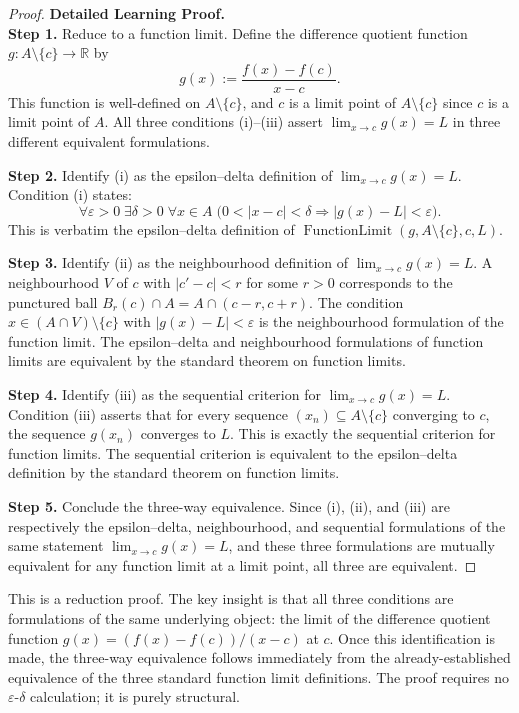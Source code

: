 \begin{proof}
\textbf{Detailed Learning Proof.}~\\

\textbf{Step 1.} Reduce to a function limit. Define the difference quotient function $g : A \setminus \{c\} \to \mathbb{R}$ by
\[
g(x) := \frac{f(x) - f(c)}{x - c}.
\]
This function is well-defined on $A \setminus \{c\}$, and $c$ is a limit point of $A \setminus \{c\}$ since $c$ is a limit point of $A$. All three conditions (i)--(iii) assert $\lim_{x \to c} g(x) = L$ in three different equivalent formulations.

\textbf{Step 2.} Identify (i) as the epsilon--delta definition of $\lim_{x \to c} g(x) = L$. Condition (i) states:
\[
\forall \varepsilon > 0\;\exists \delta > 0\;\forall x \in A\;\bigl(0 < |x-c| < \delta \Rightarrow |g(x) - L| < \varepsilon\bigr).
\]
This is verbatim the epsilon--delta definition of $\operatorname{FunctionLimit}(g, A\setminus\{c\}, c, L)$.

\textbf{Step 3.} Identify (ii) as the neighbourhood definition of $\lim_{x \to c} g(x) = L$. A neighbourhood $V$ of $c$ with $|c' - c| < r$ for some $r > 0$ corresponds to the punctured ball $B_r(c) \cap A = A \cap (c-r, c+r)$. The condition $x \in (A \cap V) \setminus \{c\}$ with $|g(x) - L| < \varepsilon$ is the neighbourhood formulation of the function limit. The epsilon--delta and neighbourhood formulations of function limits are equivalent by the standard theorem on function limits.

\textbf{Step 4.} Identify (iii) as the sequential criterion for $\lim_{x \to c} g(x) = L$. Condition (iii) asserts that for every sequence $(x_n) \subseteq A \setminus \{c\}$ converging to $c$, the sequence $g(x_n)$ converges to $L$. This is exactly the sequential criterion for function limits. The sequential criterion is equivalent to the epsilon--delta definition by the standard theorem on function limits.

\textbf{Step 5.} Conclude the three-way equivalence. Since (i), (ii), and (iii) are respectively the epsilon--delta, neighbourhood, and sequential formulations of the same statement $\lim_{x \to c} g(x) = L$, and these three formulations are mutually equivalent for any function limit at a limit point, all three are equivalent.
\end{proof}

\begin{remark*}
This is a reduction proof. The key insight is that all three conditions are formulations of the same underlying object: the limit of the difference quotient function $g(x) = (f(x)-f(c))/(x-c)$ at $c$. Once this identification is made, the three-way equivalence follows immediately from the already-established equivalence of the three standard function limit definitions. The proof requires no $\varepsilon$-$\delta$ calculation; it is purely structural.
\end{remark*}

